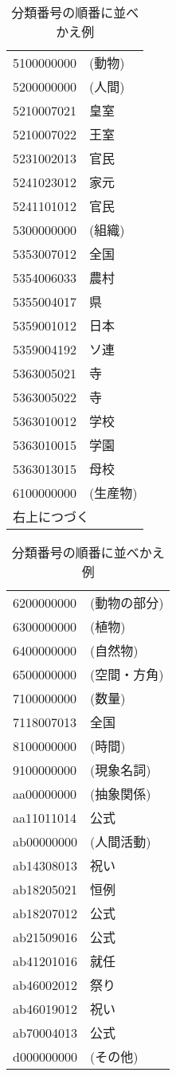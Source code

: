 \begin{enumerate}
\begin{table}[p]
  \caption{分類番号の順番に並べかえ例}
  \label{tab:sort_rei}
  \begin{center}
\small\renewcommand{\arraystretch}{}
\begin{tabular}[c]{|ll@{ }|}\hline
5100000000 & (動物)\\
5200000000 & (人間)\\
5210007021 & 皇室\\
5210007022 & 王室\\
5231002013 & 官民\\
5241023012 & 家元\\
5241101012 & 官民\\
5300000000 & (組織)\\
5353007012 & 全国\\
5354006033 & 農村\\
5355004017 & 県\\
5359001012 & 日本\\
5359004192 & ソ連\\
5363005021 & 寺\\
5363005022 & 寺\\
5363010012 & 学校\\
5363010015 & 学園\\
5363013015 & 母校\\
6100000000 & (生産物)\\
\multicolumn{2}{|l|}{右上につづく}\\\hline
\end{tabular}
\begin{tabular}[c]{|ll@{ }|}\hline
6200000000 & (動物の部分)\\
6300000000 & (植物)\\
6400000000 & (自然物)\\
6500000000 & (空間・方角)\\
7100000000 & (数量)\\
7118007013 & 全国\\
8100000000 & (時間)\\
9100000000 & (現象名詞)\\
aa00000000 & (抽象関係)\\
aa11011014 & 公式\\
ab00000000 & (人間活動)\\
ab14308013 & 祝い\\
ab18205021 & 恒例\\
ab18207012 & 公式\\
ab21509016 & 公式\\
ab41201016 & 就任\\
ab46002012 & 祭り\\
ab46019012 & 祝い\\
ab70004013 & 公式\\
d000000000 & (その他)\\\hline
\end{tabular}
\end{center}
\end{table}


\end{enumerate}
